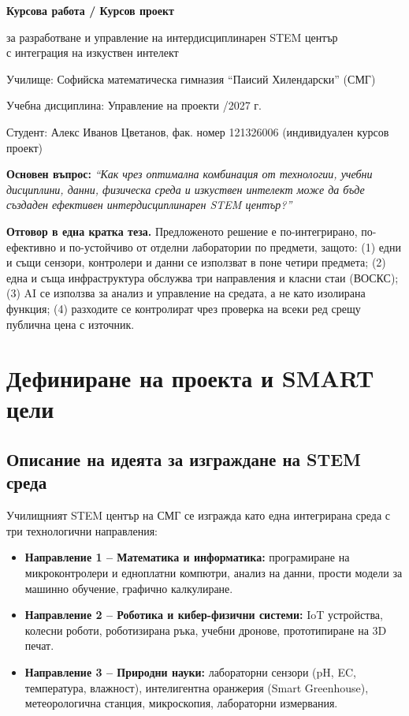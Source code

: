 \documentclass[11pt,a4paper]{article}
\begin{document}
\begin{center}
  {\LARGE\bfseries Курсова работа / Курсов проект\par}
  \vspace{4pt}
  {\Large за разработване и управление на интердисциплинарен STEM център\\с интеграция на изкуствен интелект\par}
  \vspace{14pt}
  {\large Училище: Софийска математическа гимназия ``Паисий Хилендарски'' (СМГ)\par}
  {\large Учебна дисциплина: Управление на проекти /2027 г.\par}
  \vspace{8pt}
  {\normalsize Студент: Алекс Иванов Цветанов, фак. номер 121326006 (индивидуален курсов проект)\par}
\end{center}

\vspace{6pt}
\noindent\textbf{Основен въпрос:} \emph{``Как чрез оптимална комбинация от технологии, учебни дисциплини, данни, физическа среда и изкуствен интелект може да бъде създаден ефективен интердисциплинарен STEM център?''}

\medskip
\noindent\textbf{Отговор в една кратка теза.} Предложеното решение е по-интегрирано, по-ефективно и по-устойчиво от отделни лаборатории по предмети, защото: (1) едни и същи сензори, контролери и данни се използват в поне четири предмета; (2) една и съща инфраструктура обслужва три направления и класни стаи (ВОСКС); (3) AI се използва за анализ и управление на средата, а не като изолирана функция; (4) разходите се контролират чрез проверка на всеки ред срещу публична цена с източник.

\section{Дефиниране на проекта и SMART цели}

\subsection{Описание на идеята за изграждане на STEM среда}

Училищният STEM център на СМГ се изгражда като една интегрирана среда с три технологични направления:
\begin{itemize}
  \item \textbf{Направление 1 – Математика и информатика:} програмиране на микроконтролери и едноплатни компютри, анализ на данни, прости модели за машинно обучение, графично калкулиране.
  \item \textbf{Направление 2 – Роботика и кибер-физични системи:} IoT устройства, колесни роботи, роботизирана ръка, учебни дронове, прототипиране на 3D печат.
  \item \textbf{Направление 3 – Природни науки:} лабораторни сензори (pH, EC, температура, влажност), интелигентна оранжерия (Smart Greenhouse), метеорологична станция, микроскопия, лабораторни измервания.
\end{itemize}
\end{document}
